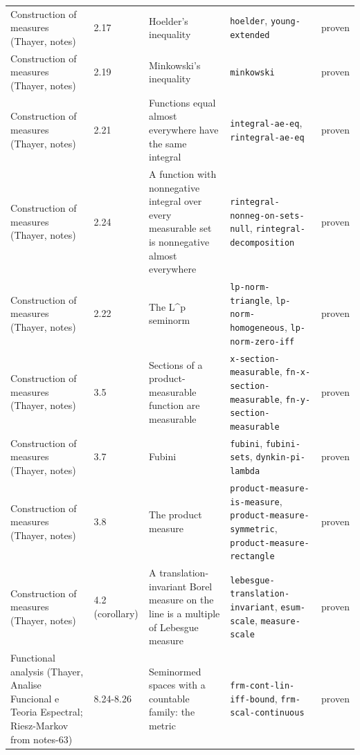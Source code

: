 \begin{longtable}{@{}ll>{\raggedright\arraybackslash}p{4.2cm}>{\raggedright\arraybackslash}p{4.2cm}l@{}}
Construction of measures (Thayer, notes) & 2.17 & Hoelder's inequality & \texttt{hoelder}, \texttt{young-\allowbreak{}extended} & proven \\
Construction of measures (Thayer, notes) & 2.19 & Minkowski's inequality & \texttt{minkowski} & proven \\
Construction of measures (Thayer, notes) & 2.21 & Functions equal almost everywhere have the same integral & \texttt{integral-\allowbreak{}ae-\allowbreak{}eq}, \texttt{rintegral-\allowbreak{}ae-\allowbreak{}eq} & proven \\
Construction of measures (Thayer, notes) & 2.24 & A function with nonnegative integral over every measurable set is nonnegative almost everywhere & \texttt{rintegral-\allowbreak{}nonneg-\allowbreak{}on-\allowbreak{}sets-\allowbreak{}null}, \texttt{rintegral-\allowbreak{}decomposition} & proven \\
Construction of measures (Thayer, notes) & 2.22 & The L\textasciicircum{}p seminorm & \texttt{lp-\allowbreak{}norm-\allowbreak{}triangle}, \texttt{lp-\allowbreak{}norm-\allowbreak{}homogeneous}, \texttt{lp-\allowbreak{}norm-\allowbreak{}zero-\allowbreak{}iff} & proven \\
Construction of measures (Thayer, notes) & 3.5 & Sections of a product-measurable function are measurable & \texttt{x-\allowbreak{}section-\allowbreak{}measurable}, \texttt{fn-\allowbreak{}x-\allowbreak{}section-\allowbreak{}measurable}, \texttt{fn-\allowbreak{}y-\allowbreak{}section-\allowbreak{}measurable} & proven \\
Construction of measures (Thayer, notes) & 3.7 & Fubini & \texttt{fubini}, \texttt{fubini-\allowbreak{}sets}, \texttt{dynkin-\allowbreak{}pi-\allowbreak{}lambda} & proven \\
Construction of measures (Thayer, notes) & 3.8 & The product measure & \texttt{product-\allowbreak{}measure-\allowbreak{}is-\allowbreak{}measure}, \texttt{product-\allowbreak{}measure-\allowbreak{}symmetric}, \texttt{product-\allowbreak{}measure-\allowbreak{}rectangle} & proven \\
Construction of measures (Thayer, notes) & 4.2 (corollary) & A translation-invariant Borel measure on the line is a multiple of Lebesgue measure & \texttt{lebesgue-\allowbreak{}translation-\allowbreak{}invariant}, \texttt{esum-\allowbreak{}scale}, \texttt{measure-\allowbreak{}scale} & proven \\
Functional analysis (Thayer, Analise Funcional e Teoria Espectral; Riesz-Markov from notes-63) & 8.24-8.26 & Seminormed spaces with a countable family: the metric & \texttt{frm-\allowbreak{}cont-\allowbreak{}lin-\allowbreak{}iff-\allowbreak{}bound}, \texttt{frm-\allowbreak{}scal-\allowbreak{}continuous} & proven \\

\end{longtable}
